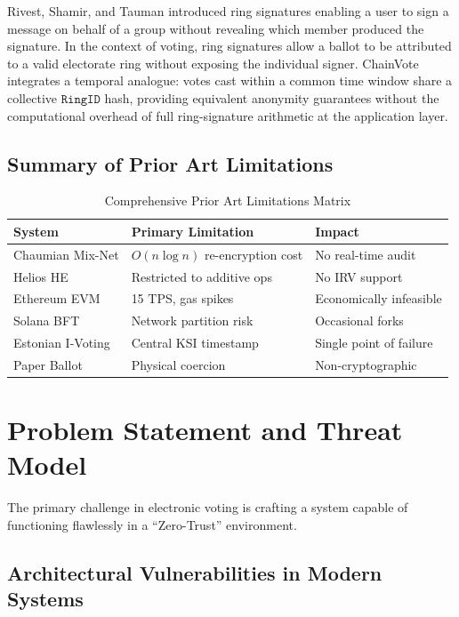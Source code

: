 \documentclass[journal,10pt,twocolumn]{IEEEtran}
\begin{document}
Rivest, Shamir, and Tauman \cite{b4} introduced ring signatures enabling a user to sign a message on behalf of a group without revealing which member produced the signature. In the context of voting, ring signatures allow a ballot to be attributed to a valid electorate ring without exposing the individual signer. ChainVote integrates a temporal analogue: votes cast within a common time window share a collective $\mathtt{RingID}$ hash, providing equivalent anonymity guarantees without the computational overhead of full ring-signature arithmetic at the application layer.

\subsection{Summary of Prior Art Limitations}

\begin{table}[htbp]
\caption{Comprehensive Prior Art Limitations Matrix}
\label{tab:priorart}
\centering
\small
{}
\begin{tabularx}{\linewidth}{@{}lXX@{}}
\toprule
\textbf{System} & \textbf{Primary Limitation} & \textbf{Impact} \\
\midrule
Chaumian Mix-Net & $O(n \log n)$ re-encryption cost & No real-time audit \\
Helios HE & Restricted to additive ops & No IRV support \\
Ethereum EVM & 15 TPS, gas spikes & Economically infeasible \\
Solana BFT & Network partition risk & Occasional forks \\
Estonian I-Voting & Central KSI timestamp & Single point of failure \\
Paper Ballot & Physical coercion & Non-cryptographic \\
\bottomrule
\end{tabularx}
\end{table}

\section{Problem Statement and Threat Model}

The primary challenge in electronic voting is crafting a system capable of functioning flawlessly in a ``Zero-Trust'' environment.

\subsection{Architectural Vulnerabilities in Modern Systems}
\end{document}
